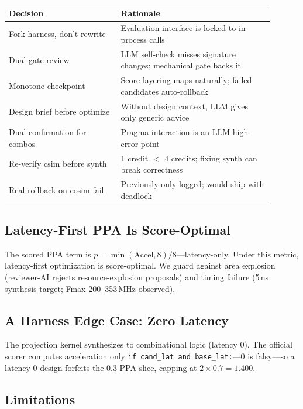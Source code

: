 \documentclass[10pt,conference,letterpaper]{IEEEtran}
\begin{document}
\begin{table}[h]
\centering
\small
\begin{tabular}{p{0.38\linewidth} p{0.52\linewidth}}
\toprule
\textbf{Decision} & \textbf{Rationale} \\
\midrule
Fork harness, don't rewrite & Evaluation interface is locked to in-process calls \\
Dual-gate review & LLM self-check misses signature changes; mechanical gate backs it \\
Monotone checkpoint & Score layering maps naturally; failed candidates auto-rollback \\
Design brief before optimize & Without design context, LLM gives only generic advice \\
Dual-confirmation for combos & Pragma interaction is an LLM high-error point \\
Re-verify csim before synth & 1 credit $<$ 4 credits; fixing synth can break correctness \\
Real rollback on cosim fail & Previously only logged; would ship with deadlock \\
\bottomrule
\end{tabular}
\end{table}

\subsection{Latency-First PPA Is Score-Optimal}
\label{sec:ppa-discussion}

The scored PPA term is $p=\min(\text{Accel},8)/8$---latency-only. Under this metric, latency-first optimization is score-optimal. We guard against area explosion (reviewer-AI rejects resource-explosion proposals) and timing failure (5\,ns synthesis target; Fmax 200--353\,MHz observed).

\subsection{A Harness Edge Case: Zero Latency}
\label{app:harness-quirk}

The projection kernel synthesizes to combinational logic (latency 0). The official scorer computes acceleration only \texttt{if cand\_lat and base\_lat:}---0 is falsy---so a latency-0 design forfeits the 0.3 PPA slice, capping at $2\times0.7=1.400$.

\subsection{Limitations}
\label{sec:limitations}
\end{document}
